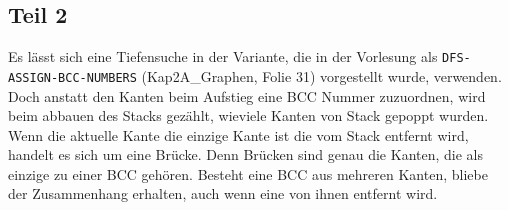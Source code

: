 \documentclass[parskip=half,a4paper]{scrartcl}
\begin{document}
\subsection*{Teil 2}

Es lässt sich eine Tiefensuche in der Variante, die in der Vorlesung als \texttt{DFS-ASSIGN-BCC-NUMBERS} (Kap2A\_Graphen, Folie 31) vorgestellt wurde, verwenden. Doch anstatt den Kanten beim Aufstieg eine BCC Nummer zuzuordnen, wird beim abbauen des Stacks gezählt, wieviele Kanten von Stack gepoppt wurden. Wenn die aktuelle Kante die einzige Kante ist die vom Stack entfernt wird, handelt es sich um eine Brücke. Denn Brücken sind genau die Kanten, die als einzige zu einer BCC gehören. Besteht eine BCC aus mehreren Kanten, bliebe der Zusammenhang erhalten, auch wenn eine von ihnen entfernt wird.
\end{document}
